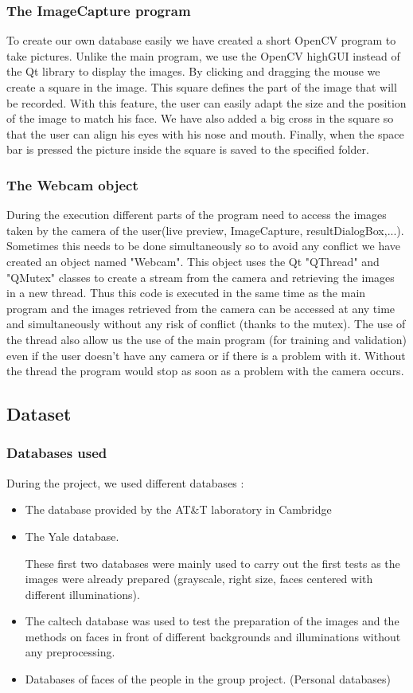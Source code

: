 \subsubsection{The ImageCapture program}
To create our own database easily we have created a short OpenCV program to take pictures. Unlike the main program, we use the OpenCV highGUI instead 
of the Qt library to display the images. By clicking and dragging the mouse we create a square in the image. This square defines the part of the image 
that will be recorded. With this feature, the user can easily adapt the size and the position of the image to match his face. We have also added a 
big cross in the square so that the user can align his eyes with his nose and mouth.
Finally, when the space bar is pressed the picture inside the square is saved to the specified folder.

\subsubsection{The Webcam object}
During the execution different parts of the program need to access the images taken by the camera of the user(live preview, ImageCapture, 
resultDialogBox,...). Sometimes this needs to be done simultaneously so to avoid any conflict we have created an object named "Webcam". This object 
uses the Qt "QThread" and "QMutex" classes to create a stream from the camera and retrieving the images in a new thread. Thus this code is executed 
in the same time as the main program and the images retrieved from the camera can be accessed at any time and simultaneously without any risk of 
conflict (thanks to the mutex).
The use of the thread also allow us the use of the main program (for training and validation) even if the user doesn't have any camera or if there is a 
problem with it. Without the thread the program would stop as soon as a problem with the camera occurs.

\subsection{Dataset}
\subsubsection{Databases used}
During the project, we used different databases :
\begin{itemize}
 \item The database provided by the AT\&T laboratory in Cambridge
\item The Yale database. 

These first two databases were mainly used to carry out the first tests as the images were already prepared (grayscale, right size, faces centered with different illuminations).
\item The caltech database was used to test the preparation of the images and the methods on faces in front of different backgrounds and illuminations without any preprocessing.
\item Databases of faces of the people in the group project. (Personal databases)
\end{itemize}
